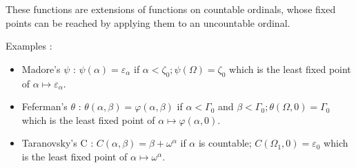 \documentclass[10pt]{article}
\begin{document}
These functions are extensions of functions on countable ordinals, whose fixed points can be reached by applying them to an uncountable ordinal.

Examples :
\vspace{-0.4cm}
\smallskip
\begin{itemize}
     \setlength{\itemsep}{1pt}
     \setlength{\parskip}{0pt}
     \setlength{\parsep}{0pt}
\item Madore's \(\psi\) : \(\psi(\alpha) = \varepsilon_\alpha \) if \(\alpha < \zeta_0 ; \psi(\Omega) = \zeta_0 \) which is the least fixed point of \( \alpha \mapsto \varepsilon_\alpha \).
\vspace{-0.1cm}
\item Feferman's \(\theta\) : \(\theta(\alpha,\beta) = \varphi(\alpha,\beta) \) if \( \alpha < \Gamma_0 \) and \( \beta < \Gamma_0 ; \theta(\Omega,0) = \Gamma_0 \) which is the least fixed point of \( \alpha \mapsto \varphi(\alpha,0) \).
\vspace{-0.1cm}
\item Taranovsky's C : \( C(\alpha,\beta) = \beta+\omega^\alpha \) if \( \alpha \) is countable; \( C(\Omega_1,0) = \varepsilon_0 \) which is the least fixed point of \( \alpha \mapsto \omega^\alpha \).
\end{itemize}

\vspace{0.1cm}
\end{document}
